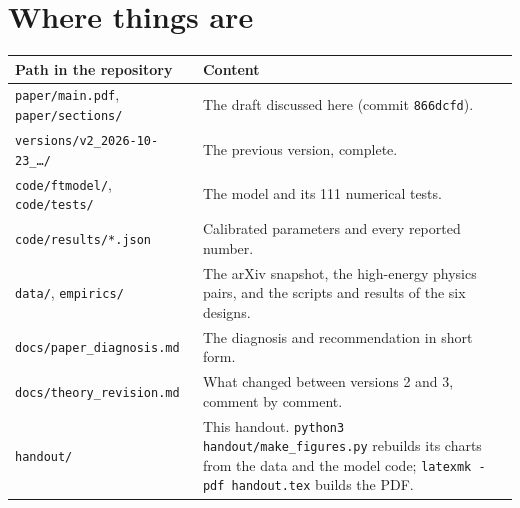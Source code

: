 \section{Where things are}\label{sec:app-files}

\begin{center}\small
\begin{tabularx}{\textwidth}{@{}P{2.3in}L@{}}
\toprule
Path in the repository & Content \\
\midrule
\texttt{paper/main.pdf}, \texttt{paper/sections/} & The draft discussed here (commit \texttt{866dcfd}). \\
\texttt{versions/v2\_2026-10-23\_\ldots/} & The previous version, complete. \\
\texttt{code/ftmodel/}, \texttt{code/tests/} & The model and its 111 numerical tests. \\
\texttt{code/results/*.json} & Calibrated parameters and every reported number. \\
\texttt{data/}, \texttt{empirics/} & The arXiv snapshot, the high-energy physics pairs, and the scripts and results of the six designs. \\
\texttt{docs/paper\_diagnosis.md} & The diagnosis and recommendation in short form. \\
\texttt{docs/theory\_revision.md} & What changed between versions 2 and 3, comment by comment. \\
\texttt{handout/} & This handout. \texttt{python3 handout/make\_figures.py} rebuilds its charts from the data and the model code; \texttt{latexmk -pdf handout.tex} builds the PDF. \\
\bottomrule
\end{tabularx}
\end{center}
